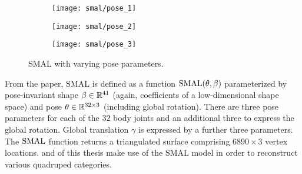     \begin{figure}[t]
    \centering
    \begin{subfigure}{0.3\linewidth}
    \centering
        \texttt{[image: smal/pose\_1]}
    \end{subfigure}%
    \begin{subfigure}{0.3\linewidth}
    \centering
        \texttt{[image: smal/pose\_2]}
    \end{subfigure}%
    \begin{subfigure}{0.3\linewidth}
        \centering
            \texttt{[image: smal/pose\_3]}
    \end{subfigure}%
    \caption{SMAL with varying pose parameters.}
    \label{fig:smal_model_poses}
\end{figure}

From the paper, SMAL is defined as a function $\operatorname{SMAL}(\theta, \beta)$ parameterized by pose-invariant shape $\beta \in {\mathbb{R}^{41}}$ (again, coefficients of a low-dimensional shape space) and pose $\theta \in {\mathbb{R}^{32 \times 3}}$ (including global rotation). There are three pose parameters for each of the $32$ body joints and an additional three to express the global rotation. Global translation $\gamma$ is expressed by a further three parameters. The $\operatorname{SMAL}$ function returns a triangulated surface comprising $6890 \times 3$ vertex locations.  and  of this thesis make use of the SMAL model in order to reconstruct various quadruped categories.
